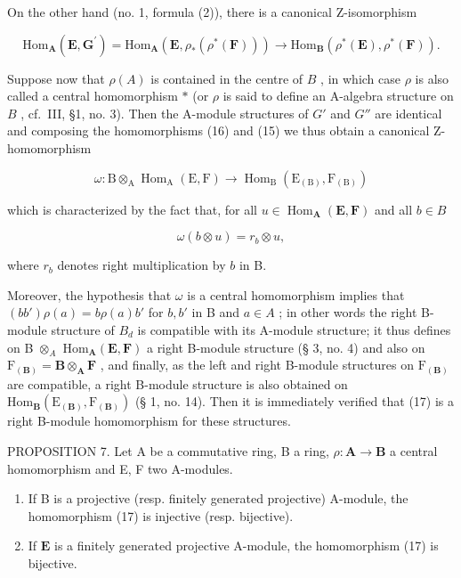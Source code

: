On the other hand (no. 1, formula (2)), there is a canonical Z-isomorphism

\[
\mathrm{Hom} _ {\mathbf {A}} (\mathbf {E}, \mathbf {G} ^ {\prime}) = \mathrm{Hom} _ {\mathbf {A}} (\mathbf {E}, \rho_ {*} (\rho^ {*} (\mathbf {F}))) \rightarrow \mathrm{Hom} _ {\mathbf {B}} (\rho^ {*} (\mathbf {E}), \rho^ {*} (\mathbf {F})). \tag {16}
\]

Suppose now that \(\rho(A)\) is contained in the centre of \(B\) , in which case \(\rho\) is also called a central homomorphism \(*\) (or \(\rho\) is said to define an A-algebra structure on \(B\) , cf.~III, §1, no. 3). Then the A-module structures of \(G'\) and \(G''\) are identical and composing the homomorphisms (16) and (15) we thus obtain a canonical Z-homomorphism

\[
\omega : \mathrm{B} \otimes_ {\mathrm{A}} \operatorname{Hom} _ {\mathrm{A}} (\mathrm{E}, \mathrm{F}) \rightarrow \operatorname{Hom} _ {\mathrm{B}} \left(\mathrm{E} _ {(\mathrm{B})}, \mathrm{F} _ {(\mathrm{B})}\right)\tag{17}
\]

which is characterized by the fact that, for all \(u \in \operatorname{Hom}_{\mathbf{A}}(\mathbf{E}, \mathbf{F})\) and all \(b \in B\)

\[
\omega (b \otimes u) = r _ {b} \otimes u,\tag{18}
\]

where \(r_b\) denotes right multiplication by \(b\) in B.

Moreover, the hypothesis that \(\omega\) is a central homomorphism implies that \((bb')\rho(a) = b\rho(a)b'\) for \(b, b'\) in B and \(a \in A\) ; in other words the right B-module structure of \(B_d\) is compatible with its A-module structure; it thus defines on B \(\otimes_A\) \(\mathrm{Hom}_{\mathbf{A}}(\mathbf{E}, \mathbf{F})\) a right B-module structure (§ 3, no. 4) and also on \(\mathrm{F}_{(\mathbf{B})} = \mathbf{B} \otimes_{\mathbf{A}} \mathbf{F}\) , and finally, as the left and right B-module structures on \(\mathrm{F}_{(\mathbf{B})}\) are compatible, a right B-module structure is also obtained on \(\mathrm{Hom}_{\mathbf{B}}(\mathrm{E}_{(\mathbf{B})}, \mathrm{F}_{(\mathbf{B})})\) (§ 1, no. 14). Then it is immediately verified that (17) is a right B-module homomorphism for these structures.

PROPOSITION 7. Let A be a commutative ring, B a ring, \(\rho: \mathbf{A} \to \mathbf{B}\) a central homomorphism and E, F two A-modules.

\begin{enumerate}
\def\labelenumi{(\roman{enumi})}
\item
  If B is a projective (resp. finitely generated projective) A-module, the homomorphism (17) is injective (resp. bijective).
\item
  If \(\mathbf{E}\) is a finitely generated projective A-module, the homomorphism (17) is bijective.
\end{enumerate}

